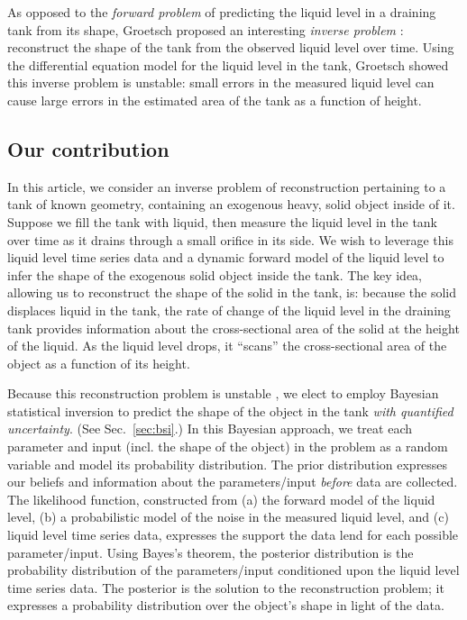 \documentclass[openacc]{rsproca_new}%
\begin{document}
As opposed to the \emph{forward problem} of predicting the liquid level in a draining tank from its shape, Groetsch \cite{groetsch1993inverse,groetsch1999inverse} proposed an interesting \emph{inverse problem} \cite{groetsch1993inverse,neto2012introduction,tarantola2005inverse}: reconstruct the shape of the tank from the observed liquid level over time. 
Using the differential equation model for the liquid level in the tank, Groetsch \cite{groetsch1993inverse} showed this inverse problem is unstable: small errors in the measured liquid level can cause large errors in the estimated area of the tank as a function of height.

\subsection{Our contribution}
In this article, we consider an inverse problem of reconstruction pertaining to a tank of known geometry, containing an exogenous heavy, solid object inside of it.
Suppose we fill the tank with liquid, then measure the liquid level in the tank over time as it drains through a small orifice in its side. 
We wish to leverage this liquid level time series data and a dynamic forward model of the liquid level to infer the shape of the exogenous solid object inside the tank. 
The key idea, allowing us to reconstruct the shape of the solid in the tank, is: because the solid displaces liquid in the tank, the rate of change of the liquid level in the draining tank provides information about the cross-sectional area of the solid at the height of the liquid.
As the liquid level drops, it ``scans'' the cross-sectional area of the object as a function of its height.

Because this reconstruction problem is unstable \cite{groetsch1993inverse}, we elect to employ Bayesian statistical inversion \cite{calvetti2018inverse,waqar2023tutorial,kaipio2006statistical,dashti2013bayesian} to predict the shape of the object in the tank \emph{with quantified uncertainty}. (See Sec.~\ref{sec:bsi}.)
In this Bayesian approach, we treat each parameter and input (incl. the shape of the object) in the problem as a random variable and model its probability distribution. 
The prior distribution expresses our beliefs and information about the parameters/input \emph{before} data are collected.
The likelihood function, constructed from (a) the forward model of the liquid level, (b) a probabilistic model of the noise in the measured liquid level, and (c) liquid level time series data, expresses the support the data lend for each possible parameter/input.
Using Bayes's theorem, the posterior distribution is the probability distribution of the parameters/input conditioned upon the liquid level time series data. The posterior is the solution to the reconstruction problem; it expresses a probability distribution over the object's shape in light of the data.
\end{document}
